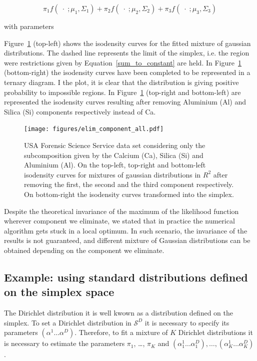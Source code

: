 \documentclass[10pt, a4paper]{article}
\begin{document}
\[
\pi_1 f(\;\cdot\; ; \mu_1, \Sigma_1) + \pi_2 f(\;\cdot\; ; \mu_2, \Sigma_2) + \pi_3 f(\;\cdot\; ; \mu_3, \Sigma_3)
\]

with parameters

{\small  }


Figure~\ref{fig05component_elimination} (top-left) shows the isodensity curves for the fitted mixture of gaussian distributions. The dashed line represents the limit of the simplex, i.e. the region were restrictions given by Equation~\ref{sum_to_constant} are held. In Figure~\ref{fig05component_elimination} (bottom-right) the isodensity curves have been completed to be represented in a ternary diagram. I the plot, it is clear that the distribution is giving positive probability to impossible regions. In Figure~\ref{fig05component_elimination} (top-right and bottom-left) are represented the isodensity curves resulting after removing Aluminium (Al) and Silica (Si) components respectively instead of Ca.

\begin{figure}[htbp]
\texttt{[image: figures/elim\_component\_all.pdf]}
\caption{USA Forensic Science Service data set considering only the subcomposition given by the Calcium (Ca), Silica (Si) and Aluminium (Al). On the top-left, top-right and bottom-left isodensity curves for mixtures of gaussian distributions in $R^{2}$ after removing the first, the second and the third component respectively. On bottom-right the isodensity curves transformed into the simplex.}
\label{fig05component_elimination}
\end{figure}

Despite the theoretical invariance of the maximum of the likelihood function wherever component we eliminate, we stated that in practice the numerical algorithm gets stuck in a local optimum. In such scenario, the invariance of the results is not guaranteed, and different mixture of Gaussian distributions can be obtained depending on the component we eliminate. 



\subsection*{Example: using standard distributions defined on the simplex space}

The Dirichlet distribution it is well kwown as a distribution defined on the simplex. To set a Dirichlet distribution in $\mathcal{S}^D$ it is necessary to specify its parameters $\left( \alpha^1 \dots \alpha^D \right)$. Therefore, to fit a mixture of $K$ Dirichlet distributions it is necessary to estimate the parameters $\pi_1$, \dots, $\pi_K$ and $\left( \alpha^1_1 \dots \alpha^D_1 \right), \dots, \left( \alpha^1_K \dots \alpha^D_K \right)$.
\end{document}
